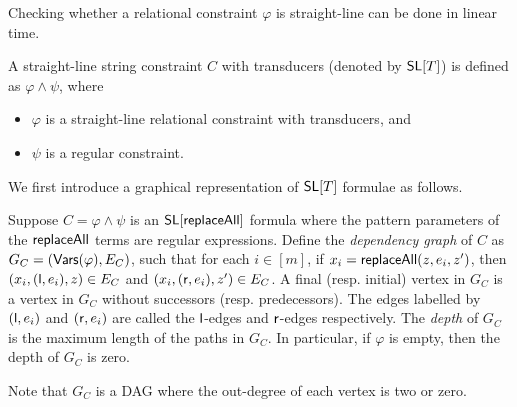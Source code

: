 \documentclass{llncs}
\begin{document}
\begin{remark}
	Checking whether a relational constraint $\varphi$ is straight-line can be done in linear time. 
\end{remark}

\begin{definition}
	A straight-line string constraint $C$ with transducers (denoted by $\mathsf{SL}[T]$)  is defined as $ \varphi \wedge \psi$,  where 
	\begin{itemize}
		\item $\varphi$ is a straight-line relational constraint with transducers,  and
		\item $\psi$ is a regular constraint.
	\end{itemize} 
\end{definition}

 
 
 We first introduce a graphical representation of $\mathsf{SL}[T]$ formulae as follows.    
 
 \begin{definition}
 	\label{def:dep-graph}
 	Suppose $C= \varphi \wedge \psi$ is an $\mathsf{SL}[\mathsf{replaceAll}]$ formula where the pattern parameters of the $\mathsf{replaceAll}$ terms are regular expressions. %
 	Define the \emph{dependency graph} of $C$ as $G_C= (\mathsf{Vars}(\varphi), E_C)$, such that for each $i \in [m]$, if $x_i = \mathsf{replaceAll}(z, e_i, z')$, then $(x_i, (\mathsf{l}, e_i), z) \in E_C$ and $(x_i, (\mathsf{r}, e_i), z') \in E_C$. A final (resp. initial) vertex in $G_C$ is a vertex in $G_C$ without successors (resp. predecessors). The edges labelled by $(\mathsf{l}, e_i)$ and $(\mathsf{r}, e_i)$ are called the $\mathsf{l}$-edges and $\mathsf{r}$-edges respectively. The \emph{depth} of $G_C$ is the maximum length of the paths in $G_C$. In particular, if $\varphi$ is empty, then the depth of $G_C$ is zero. 
 \end{definition}
 Note that $G_C$ is a DAG where the out-degree of each vertex is two or zero. 
 
\end{document}
